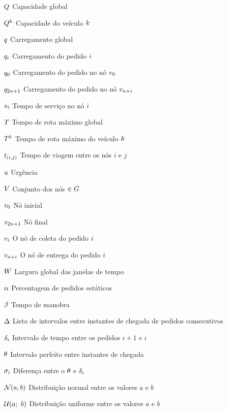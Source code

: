 \begin{simbolos}
    \item[$Q$] Capacidade global
    \item[$Q^{k}$] Capacidade do veículo $k$
    \item[$q$] Carregamento global
    \item[$q_i$] Carregamento do pedido $i$
    \item[$q_{0}$] Carregamento do pedido no nó $v_{0}$
    \item[$q_{2n + 1}$]
     Carregamento do pedido no nó $v_{n + i}$
    \item[$s_{i}$]
      Tempo de serviço no nó $i$
    \item[$T$] Tempo de rota máximo global
    \item[$T^k$] Tempo de rota máximo do veículo $k$
    \item[$t_{(i,j)}$] Tempo de viagem entre os nós $i$ e $j$
    \item[$u$] Urgência
    \item[$V$] Conjunto dos nós $\in G$
    \item[$v_{0}$] Nó inicial
    \item[$v_{2n + 1}$] Nó final 
    \item[$v_{i}$] O nó de coleta do pedido $i$
    \item[$v_{n + i}$] O nó de entrega do pedido $i$
    \item[$W$] Largura global das janelas de tempo 
    \item[$\alpha$] Percentagem de pedidos estáticos
    \item[$\beta$] Tempo de manobra
    \item[$\Delta$]
      Lista de intervalos entre instantes de chegada de pedidos 
      consecutivos
    \item[$\delta_i$]
      Intervalo de tempo entre os pedidos $i + 1$ e $i$
    \item[$\theta$] Intervalo perfeito entre instantes de chegada
    \item[$\sigma_i$]
      Diferença entre o $\theta$ e 
      $\delta_i$
    \item[$\mathcal{N}(a,b)$]
       Distribuição normal entre os valores $a$ e $b$
    \item[$\mathcal{U}(a;\ b)$]
      Distribuição uniforme entre os valores $a$ e $b$
\end{simbolos}
